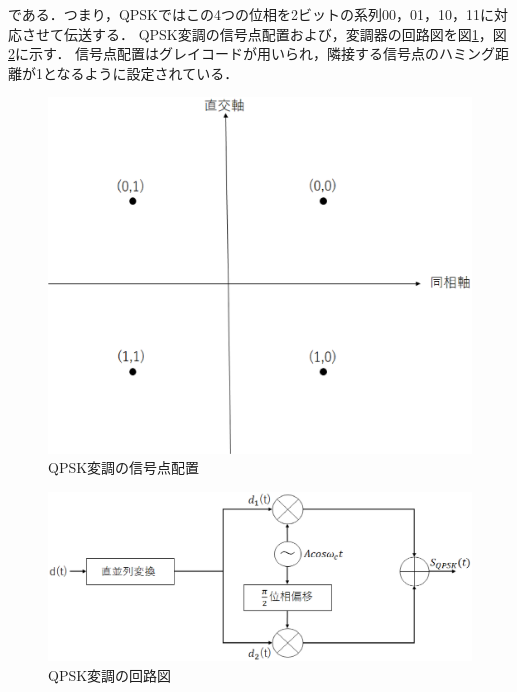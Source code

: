 である．つまり，QPSKではこの4つの位相を2ビットの系列00，01，10，11に対応させて伝送する．
QPSK変調の信号点配置および，変調器の回路図を図\ref{fig:qpskIQ}，図\ref{fig:qpskmod}に示す．
信号点配置はグレイコードが用いられ，隣接する信号点のハミング距離が1となるように設定されている．
\begin{figure}[t]
  \begin{center}
    \includegraphics[width=0.6\linewidth]{chapter2/figure/QPSKIQ.eps}
    \caption{QPSK変調の信号点配置}
    \label{fig:qpskIQ}
  \end{center}
\end{figure}
\begin{figure}[t]
  \begin{center}
    \includegraphics[width=0.8\linewidth]{chapter2/figure/QPSKshift.eps}
    \caption{QPSK変調の回路図}
    \label{fig:qpskmod}
  \end{center}
\end{figure}

